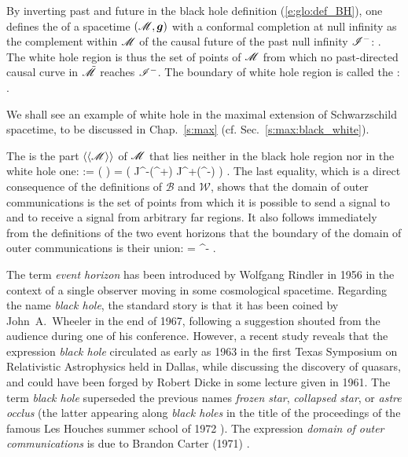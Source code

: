 By inverting past and future in the black hole definition (\ref{e:glo:def_BH}), one defines
the  of a
spacetime $(\mathscr{M},\bm{g})$ with a conformal completion at null infinity as the
complement within $\mathscr{M}$ of the causal future of the past null infinity $\mathscr{I}^-$:
\be \label{e:glo:def_white_hole}
     .
\ee
The white hole region is thus the set of points of $\mathscr{M}$
from which no past-directed causal curve in $\tilde{\mathscr{M}}$ reaches $\mathscr{I}^-$.
The boundary of white hole region is called the
:
\be
     .
\ee

\begin{example}
We shall see an example of white hole in the maximal extension of
Schwarzschild spacetime, to be discussed in Chap.~\ref{s:max} (cf. Sec.~\ref{s:max:black_white}).
\end{example}

The 
is the part $\langle\langle \mathscr{M}\rangle\rangle$ of $\mathscr{M}$ that lies neither
in the black hole region nor in the white hole one:
\be
    \langle\langle \M\rangle\rangle := \M\setminus (\cup {} )
            = \left( J^-(\scri^+) \cap J^+(\scri^-) \right) \cap \M .
\ee
The last equality, which is a direct consequence of the definitions of
$\mathscr{B}$ and $\mathscr{W}$, shows that the domain of outer communications
is the set of points from which it is possible to send a signal to and to
receive a signal from arbitrary far regions.
It also follows immediately from the definitions of the two event horizons
that the boundary of the domain of outer communications is their union:
\be
    \partial \langle\langle \M\rangle\rangle  = \Hor \cup \Hor^- .
\ee

\begin{hist}
The term \emph{event horizon} has been introduced by Wolfgang Rindler in 1956 \cite{Rindl56}
in the context of a single observer moving in some cosmological spacetime.
Regarding the name \emph{black hole}, the standard
story is that it has been coined by John~A.~Wheeler in the end of 1967,
following a suggestion shouted from the audience during one of his conference.
However, a recent study \cite{HerdeL18} reveals that the expression \emph{black hole}
circulated as early as 1963 in the first Texas Symposium on Relativistic Astrophysics
held in Dallas,
while discussing the discovery of quasars, and could have been forged by
Robert Dicke in some lecture given in 1961.
The term \emph{black hole} superseded the previous names
\emph{frozen star}, \emph{collapsed star}, or \emph{astre occlus}
(the latter appearing along \emph{black holes} in the title of
the proceedings of the famous Les Houches summer school of 1972 \cite{DeWit73}).
The expression \emph{domain of outer communications} is due to
Brandon Carter
(1971) \cite{Carte71}.
\end{hist}


